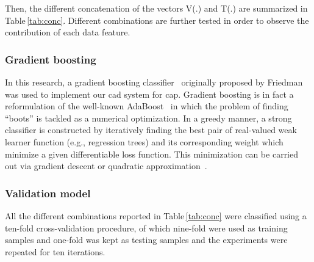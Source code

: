Then, the different concatenation of the vectors V(.) and T(.) are summarized in Table\,\ref{tab:conc}. Different combinations are further tested in order to observe the contribution of each data feature.

\subsubsection{Gradient boosting}\label{subsubsec:gradboost}

In this research, a gradient boosting classifier~\cite{Becker2013} originally proposed by Friedman~\cite{Friedman1999,Friedman2000} was used to implement our \ac{cad} system for \ac{cap}. Gradient boosting is in fact a reformulation of the well-known AdaBoost~\cite{Freund1997} in which the problem of finding ``boots'' is tackled as a numerical optimization. In a greedy manner, a strong classifier is constructed by iteratively finding the best pair of real-valued weak learner function (e.g., regression trees) and its corresponding weight which minimize a given differentiable loss function. This minimization can be carried out via gradient descent or quadratic approximation~\cite{Zheng2008}.

\subsubsection{Validation model}\label{subsubsec:valmod}

All the different combinations reported in Table\,\ref{tab:conc} were classified using a ten-fold cross-validation procedure, of which nine-fold were used as training samples and one-fold was kept as testing samples and the experiments were repeated for ten iterations. 

